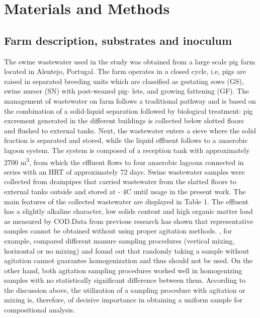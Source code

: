 \section{Materials and Methods}
\subsection{Farm description, substrates and inoculum}
The swine wastewater used in the study was obtained from a large scale pig farm located in Alentejo, Portugal. The farm operates in a closed cycle, i.e, pigs are raised in separated breeding units which are classified as gestating sows (GS), swine nurser (SN) with post-weaned pig- lets, and growing fattening (GF). The management of wastewater on farm follows a traditional pathway and is based on the combination of a solid-liquid separation followed by biological treatment: pig excrement generated in the different buildings is collected below slotted floors and flushed to external tanks. Next, the wastewater enters a sieve where the solid fraction is separated and stored, while the liquid effluent follows to a anaerobic lagoon system. The system is composed of a reception tank with approximately 2700 m\textsuperscript{3}, from which the effluent flows to four anaerobic lagoons connected in series with an HRT of approximately 72 days. Swine wastewater samples were collected from drainpipes that carried wastewater from the slatted floors to external tanks outside and stored at - 4\textdegree C until usage in the present work. The main features of the collected wastewater are displayed in Table 1. The effluent has a slightly alkaline character, low solids content and high organic matter load as measured by COD.Data from previous research has shown that representative samples cannot be obtained without using proper agitation methods. \cite{Zhu_2004}, for example, compared different manure sampling procedures (vertical mixing, horizontal or no mixing) and found out that randomly taking a sample without agitation cannot guarantee homogenization and thus should not be used. On the other hand, both agitation sampling procedures worked well in homogenizing samples with no statistically significant difference between them.  According to the discussion above, the utilization of a sampling procedure with agitation or mixing is, therefore, of decisive importance in obtaining a uniform sample for compositional analysis.
